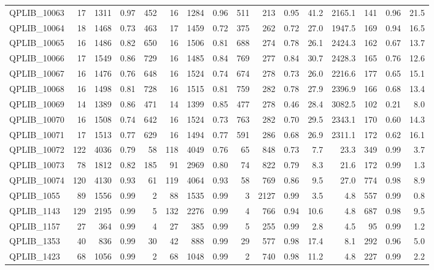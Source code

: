 \documentclass[twoside]{article}
\begin{document}
\begin{longtable}{l|rrrr|rrrr|rrr|rrrr}
		QPLIB\_10063 & 17 & 1311 & 0.97 & 452 & 16 & 1284 & 0.96 & 511 & 213 & 0.95 & 41.2 & 2165.1 & 141 & 0.96 & 21.5 \\
		QPLIB\_10064 & 18 & 1468 & 0.73 & 463 & 17 & 1459 & 0.72 & 375 & 262 & 0.72 & 27.0 & 1947.5 & 169 & 0.94 & 16.5 \\
		QPLIB\_10065 & 16 & 1486 & 0.82 & 650 & 16 & 1506 & 0.81 & 688 & 274 & 0.78 & 26.1 & 2424.3 & 162 & 0.67 & 13.7 \\
		QPLIB\_10066 & 17 & 1549 & 0.86 & 729 & 16 & 1485 & 0.84 & 769 & 277 & 0.84 & 30.7 & 2428.3 & 165 & 0.76 & 12.6 \\
		QPLIB\_10067 & 16 & 1476 & 0.76 & 648 & 16 & 1524 & 0.74 & 674 & 278 & 0.73 & 26.0 & 2216.6 & 177 & 0.65 & 15.1 \\
		QPLIB\_10068 & 16 & 1498 & 0.81 & 728 & 16 & 1515 & 0.81 & 759 & 282 & 0.78 & 27.9 & 2396.9 & 166 & 0.68 & 13.4 \\
		QPLIB\_10069 & 14 & 1389 & 0.86 & 471 & 14 & 1399 & 0.85 & 477 & 278 & 0.46 & 28.4 & 3082.5 & 102 & 0.21 & 8.0 \\
		QPLIB\_10070 & 16 & 1508 & 0.74 & 642 & 16 & 1524 & 0.73 & 763 & 282 & 0.70 & 29.5 & 2343.1 & 170 & 0.60 & 14.3 \\
		QPLIB\_10071 & 17 & 1513 & 0.77 & 629 & 16 & 1494 & 0.77 & 591 & 286 & 0.68 & 26.9 & 2311.1 & 172 & 0.62 & 16.1 \\
		QPLIB\_10072 & 122 & 4036 & 0.79 & 58 & 118 & 4049 & 0.76 & 65 & 848 & 0.73 & 7.7 & 23.3 & 349 & 0.99 & 3.7 \\
		QPLIB\_10073 & 78 & 1812 & 0.82 & 185 & 91 & 2969 & 0.80 & 74 & 822 & 0.79 & 8.3 & 21.6 & 172 & 0.99 & 1.3 \\
		QPLIB\_10074 & 120 & 4130 & 0.93 & 61 & 119 & 4064 & 0.93 & 58 & 769 & 0.86 & 9.5 & 27.0 & 774 & 0.98 & 8.9 \\
		QPLIB\_1055 & 89 & 1556 & 0.99 & 2 & 88 & 1535 & 0.99 & 3 & 2127 & 0.99 & 3.5 & 4.8 & 557 & 0.99 & 0.8 \\
		QPLIB\_1143 & 129 & 2195 & 0.99 & 5 & 132 & 2276 & 0.99 & 4 & 766 & 0.94 & 10.6 & 4.8 & 687 & 0.98 & 9.5 \\
		QPLIB\_1157 & 27 & 364 & 0.99 & 4 & 27 & 385 & 0.99 & 5 & 255 & 0.99 & 2.8 & 4.5 & 95 & 0.99 & 1.2 \\
		QPLIB\_1353 & 40 & 836 & 0.99 & 30 & 42 & 888 & 0.99 & 29 & 577 & 0.98 & 17.4 & 8.1 & 292 & 0.96 & 5.0 \\
		QPLIB\_1423 & 68 & 1056 & 0.99 & 2 & 68 & 1048 & 0.99 & 2 & 740 & 0.98 & 11.2 & 4.8 & 227 & 0.99 & 2.2 \\

\end{longtable}
\end{document}
